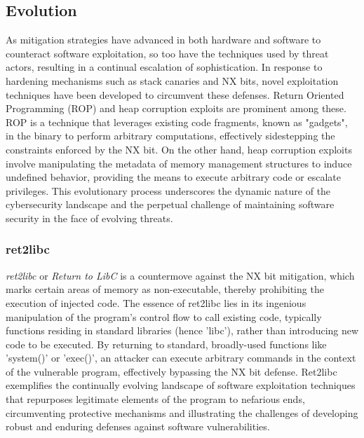 \documentclass{article}
\begin{document}
\subsection{Evolution}
\begin{comment} ret2libc
  Mention the lack of mitigation
  Rise of heap based exploits due to browsers and JS
  Research some linux&windows kernel exploits
\end{comment}
As mitigation strategies have advanced in both hardware and software to counteract software exploitation, so too have the techniques used by threat actors, resulting in a continual escalation of sophistication. In response to hardening mechanisms such as stack canaries and NX bits, novel exploitation techniques have been developed to circumvent these defenses. Return Oriented Programming (ROP) and heap corruption exploits are prominent among these. ROP is a technique that leverages existing code fragments, known as "gadgets", in the binary to perform arbitrary computations, effectively sidestepping the constraints enforced by the NX bit. On the other hand, heap corruption exploits involve manipulating the metadata of memory management structures to induce undefined behavior, providing the means to execute arbitrary code or escalate privileges. This evolutionary process underscores the dynamic nature of the cybersecurity landscape and the perpetual challenge of maintaining software security in the face of evolving threats.

\subsubsection{ret2libc}
\emph{ret2libc} or \emph{Return to LibC} is a countermove against the NX bit mitigation, which marks certain areas of memory as non-executable, thereby prohibiting the execution of injected code. The essence of ret2libc lies in its ingenious manipulation of the program's control flow to call existing code, typically functions residing in standard libraries (hence 'libc'), rather than introducing new code to be executed. By returning to standard, broadly-used functions like 'system()' or 'exec()', an attacker can execute arbitrary commands in the context of the vulnerable program, effectively bypassing the NX bit defense. Ret2libc exemplifies the continually evolving landscape of software exploitation techniques that repurposes legitimate elements of the program to nefarious ends, circumventing protective mechanisms and illustrating the challenges of developing robust and enduring defenses against software vulnerabilities.
\end{document}
